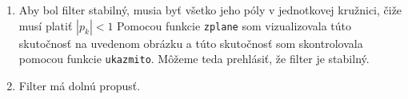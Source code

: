 \documentclass[10pt, a4paper, twocolumn]{article}
\begin{document}
\begin{enumerate}[leftmargin=*]
\item Aby bol filter stabilný, musia byť všetko jeho póly v jednotkovej kružnici, čiže musí platiť  $|p_k| < 1$ Pomocou funkcie \texttt{zplane} som vizualizovala túto skutočnosť na uvedenom obrázku a túto skutočnosť som skontrolovala pomocou funkcie \texttt{ukazmito}. Môžeme teda prehlásiť, že filter je stabilný.
\begin{figure}[H]
\centering
{}
\end{figure}

\item Filter má dolnú propusť.
\begin{figure}[H]
\centering
{}
\end{figure}


\end{enumerate}
\end{document}
